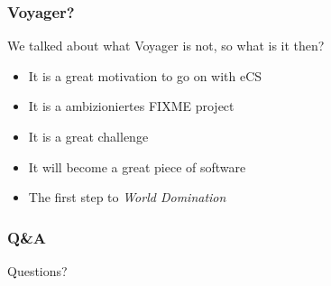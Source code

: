 \documentclass{beamer}
\begin{document}
\begin{frame}
\frametitle{Voyager?}
We talked about what Voyager is not, so what is it then?
\begin{itemize}[<+->]
  \item It is a great motivation to go on with eCS
  \item It is a ambizioniertes FIXME project
  \item It is a great challenge
  \item It will become a great piece of software
  \item The first step to \textit{World Domination\texttrademark}
\end{itemize}
\end{frame}


\begin{frame}
\frametitle{Q\&A}
	Questions?
\end{frame}

% 
\end{document}
